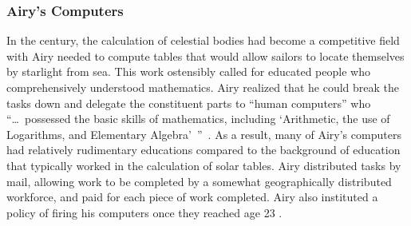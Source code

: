 \documentclass[trackingWork]{subfiles}
\begin{document}
\subsubsection{Airy's Computers}
In the  century, the calculation of celestial bodies had become
a competitive field with 
Airy needed to compute tables that would
allow sailors to locate themselves by starlight from sea.
This work ostensibly called for educated people who comprehensively understood mathematics.
Airy realized that he could break the tasks down and delegate the constituent parts
to ``human computers'' who
``\dots~possessed the basic skills of mathematics,
including `Arithmetic, the use of Logarithms, and Elementary Algebra'~''~\cite{grier2013computers}.
As a result, many of Airy's computers had relatively rudimentary educations
compared to the background of education that typically worked in the calculation of solar tables.
Airy distributed tasks by mail,
allowing work to be completed by a somewhat geographically distributed workforce,
and paid for each piece of work completed.
Airy also instituted a policy of firing his computers once they reached age 23
.









\onlyinsubfile{
  \printbibliography
  }
\end{document}
